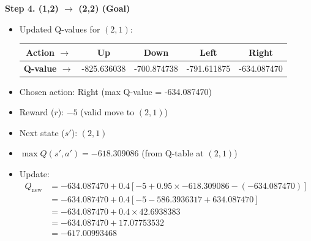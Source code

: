\documentclass{article}
\begin{document}
\begin{itemize}
\noindent\textbf{Step 4. (1,2) \(\rightarrow\) (2,2) (Goal)}
\begin{itemize}
    \item Updated Q-values for \((2,1)\):
    \begin{tabular}{|c|c|c|c|c|}
        \textbf{Action $\rightarrow$ } & Up & Down & Left & Right \\
        \hline
        \textbf{Q-value $\rightarrow$ } &-825.636038 & -700.874738 & -791.611875 & -634.087470 \\
    \end{tabular}
    \vspace{10pt}
    \item Chosen action: Right (max Q-value = -634.087470)
    \item Reward (\(r\)): \(-5\) (valid move to \((2,1)\))
    \item Next state (\(s'\)): \((2,1)\)
    \item \(\max Q(s', a') = -618.309086\) (from Q-table at \((2,1)\))
    \item Update:
    \begin{align*}
        Q_{\text{new}} &= -634.087470 + 0.4 \left[ -5 + 0.95 \times -618.309086 - (-634.087470) \right] \\
        &= -634.087470 + 0.4 \left[ -5 - 586.3936317 + 634.087470 \right] \\
        &= -634.087470 + 0.4 \times 42.6938383 \\
        &= -634.087470 + 17.07753532 \\
        &= -617.00993468
    \end{align*}
\end{itemize}


\end{itemize}
\end{document}
